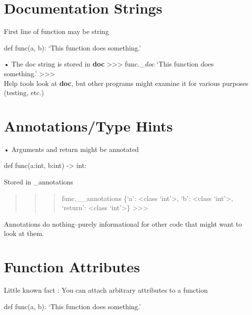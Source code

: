 \documentclass[
  letterpaper,
  DIV=11,
  numbers=noendperiod]{scrreprt}
\begin{document}

\chapter{Documentation Strings}\label{documentation-strings}

First line of function may be string

def func(a, b): `This function does something.'

• The doc string is stored in \textbf{doc}
\textgreater\textgreater\textgreater{} func.\_\emph{doc} `This function
does something.' \textgreater\textgreater\textgreater{}\\
Help tools look at \textbf{doc}, but other programs might examine it for
various purposes (testing, etc.)


\chapter{Annotations/Type Hints}\label{annotationstype-hints}

• Arguments and return might be annotated

def func(a:int, b:int) -\textgreater{} int:

Stored in \_annotations

\begin{quote}
\begin{quote}
\begin{quote}
func.\_\_annotations \{`a': \textless class `int'\textgreater, `b':
\textless class `int'\textgreater, `return': \textless class
`int'\textgreater\} \textgreater\textgreater\textgreater{}
\end{quote}
\end{quote}
\end{quote}

Annotations do nothing--purely informational for other code that might
want to look at them.


\chapter{Function Attributes}\label{function-attributes}

Little known fact : You can attach arbitrary attributes to a function

def func(a, b): `This function does something.'
\end{document}
